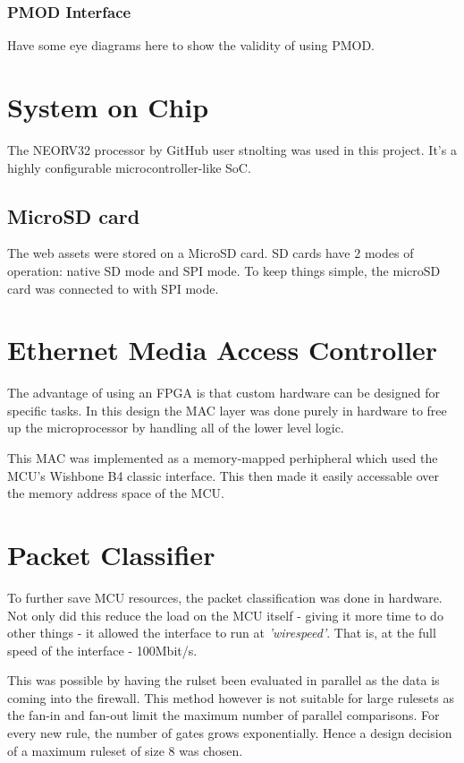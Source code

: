 \subsubsection{PMOD Interface}

Have some eye diagrams here to show the validity of using PMOD.

\section{System on Chip}

The NEORV32 processor by GitHub user stnolting was used in this project. It's a highly configurable microcontroller-like SoC. 


\subsection{MicroSD card}
The web assets were stored on a MicroSD card. SD cards have 2 modes of operation: native SD mode and SPI mode. To keep things simple, the microSD card was connected to with SPI mode. 




\section{Ethernet Media Access Controller}
The advantage of using an FPGA is that custom hardware can be designed for specific tasks. In this design the MAC layer was done purely in hardware to free up the microprocessor by handling all of the lower level logic. 

This MAC was implemented as a memory-mapped perhipheral which used the MCU's Wishbone B4 classic interface. This then made it easily accessable over the memory address space of the MCU.  



\section{Packet Classifier}

To further save MCU resources, the packet classification was done in hardware. Not only did this reduce the load on the MCU itself - giving it more time to do other things - it allowed the interface to run at \textit{'wirespeed'}. That is, at the full speed of the interface - 100Mbit/s. 

This was possible by having the rulset been evaluated in parallel as the data is coming into the firewall. This method however is not suitable for large rulesets as the fan-in and fan-out limit the maximum number of parallel comparisons. For every new rule, the number of gates grows exponentially. Hence a design decision of a maximum ruleset of size 8 was chosen. 

